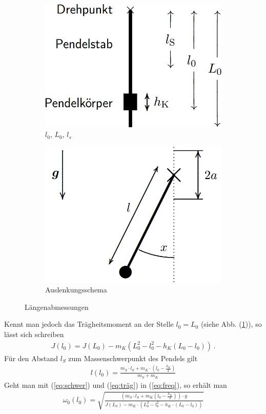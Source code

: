 \documentclass[numbers=noenddot,12pt,a4paper]{scrartcl}
\begin{document}
\begin{figure}[H]
\centering
\begin{subfigure}[b]{0.3\textwidth}
\includegraphics[width=\textwidth]{lnull.png}
\caption{$l_0$, $L_0$, $l_s$} \label{img:lnull}
\end{subfigure}
\begin{subfigure}[b]{0.3\textwidth}
\includegraphics[width=\textwidth]{auslenkung.png}
\caption{Auslenkungsschema} \label{img:auslenkung}
\end{subfigure}
\caption{Längenabmessungen} \label{img:abmessungen}
\end{figure}
Kennt man jedoch das Trägheitsmoment an der Stelle $l_0=L_0$ (siehe Abb. (\ref{img:lnull})), so lässt sich schreiben
\begin{align}
J(l_0)=J(L_0)-m_K\left(L_0^2-l_0^2-h_K\left(L_0-l_0\right)\right) \, . \label{eq:träg}
\end{align}
Für den Abstand $l_S$ zum Massenschwerpunkt des Pendels gilt
\begin{align}
l(l_0)=\frac{m_S\cdot l_S + m_K \cdot \left( l_0- \frac{h_K}{2}\right)}{m_S+m_K} \label{eq:schwer}
\end{align}
Geht man mit (\ref{eq:schwer}) und (\ref{eq:träg}) in (\ref{eq:freq}), so erhält man
\begin{align}
\omega_0(l_0)=\sqrt{\frac{\left(m_S\cdot l_S+m_K\left(l_0-\frac{h_K}{2}\right)\right)\cdot g}{J(L_0)-m_K\cdot \left(L_0^2-l_0^2-h_K\cdot\left(L_0-l_0\right)\right)}}
\end{align}
\end{document}
